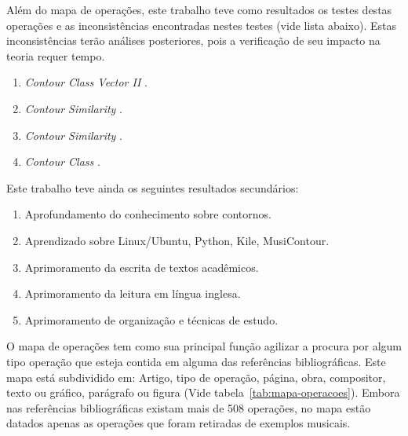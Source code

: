 \documentclass[11pt]{article}
\newcommand{\eng}[1]{\textit{#1}}
\begin{document}
Além do mapa de operações, este trabalho teve como resultados os
testes destas operações e as inconsistências encontradas nestes testes
(vide lista abaixo). Estas inconsistências terão análises posteriores,
pois a verificação de seu impacto na teoria requer tempo.

\begin{enumerate}
\item \eng{Contour Class Vector II} \cite[p. 241]{Friedmann1985}.
\item \eng{Contour Similarity} \cite[p. 242]{Quinn1997}.
\item \eng{Contour Similarity} \cite[p. 262]{Quinn1997}.
\item \eng{Contour Class} \cite[p. 113]{Schultz2008}.
\end{enumerate}

Este trabalho teve ainda os seguintes resultados secundários:

\begin{enumerate}
\item Aprofundamento do conhecimento sobre contornos.
\item Aprendizado sobre Linux/Ubuntu, Python, Kile, MusiContour.
\item Aprimoramento da escrita de textos acadêmicos.
\item Aprimoramento da leitura em língua inglesa.
\item Aprimoramento de organização e técnicas de estudo.
\end{enumerate}

\label{sec:discussao}

O mapa de operações tem como sua principal função agilizar a procura por
algum tipo operação que esteja contida em alguma das referências bibliográficas.
Este mapa está subdividido em: Artigo, tipo de operação, página, obra, compositor,
texto ou gráfico, parágrafo ou figura (Vide tabela~\ref{tab:mapa-operacoes}). 
Embora nas referências bibliográficas existam mais de 508 operações, no mapa estão 
datados apenas as operações que foram retiradas de exemplos musicais.
\end{document}
